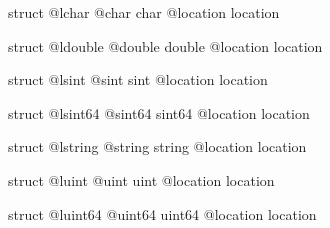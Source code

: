 \begin{galgas3}
struct @lchar {
  @char char
  @location location
}
\end{galgas3}



\begin{galgas3}
struct @ldouble {
  @double double
  @location location
}
\end{galgas3}








\begin{galgas3}
struct @lsint {
  @sint sint
  @location location
}
\end{galgas3}









\begin{galgas3}
struct @lsint64 {
  @sint64 sint64
  @location location
}
\end{galgas3}








\begin{galgas3}
struct @lstring {
  @string string
  @location location
}
\end{galgas3}








\begin{galgas3}
struct @luint {
  @uint uint
  @location location
}
\end{galgas3}







\begin{galgas3}
struct @luint64 {
  @uint64 uint64
  @location location
}
\end{galgas3}



